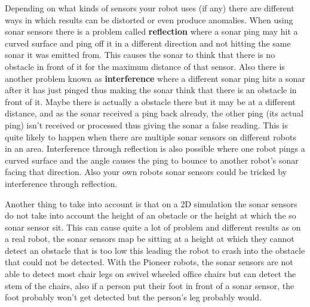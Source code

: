 \documentclass[a4paper,12pt]{article}
\begin{document}
\noindent Depending on what kinds of sensors your robot uses (if any) there are different ways in which results can be distorted or even produce anomalies. When using sonar sensors there is a problem called \textbf{reflection} where a sonar ping may hit a curved surface and ping off it in a different direction and not hitting the same sonar it was emitted from. This causes the sonar to think that there is no obstacle in front of it for the maximum distance of that sensor. Also there is another problem known as \textbf{interference} where a different sonar ping hits a sonar after it has just pinged thus making the sonar think that there is an obstacle in front of it. Maybe there is actually a obstacle there but it may be at a different distance, and as the sonar received a ping back already, the other ping (its actual ping) isn't received or processed thus giving the sonar a false reading. This is quite likely to happen when there are multiple sonar sensors on different robots in an area. Interference through reflection is also possible where one robot pings a curved surface and the angle causes the ping to bounce to another robot's sonar facing that direction. Also your own robots sonar sensors could be tricked by interference through reflection.

\vspace{5mm}
\noindent Another thing to take into account is that on a 2D simulation the sonar sensors do not take into account the height of an obstacle or the height at which the so sonar sensor sit. This can cause quite a lot of problem and different results as on a real robot, the sonar sensors map be sitting at a height at which they cannot detect an obstacle that is too low this leading the robot to crash into the obstacle that could not be detected. With the Pioneer robots, the sonar sensors are not able to detect most chair legs on swivel wheeled office chairs but can detect the stem of the chairs, also if a person put their foot in front of a sonar sensor, the foot probably won't get detected but the person's leg probably would.

\vspace{5mm}
\noindent 
\end{document}
